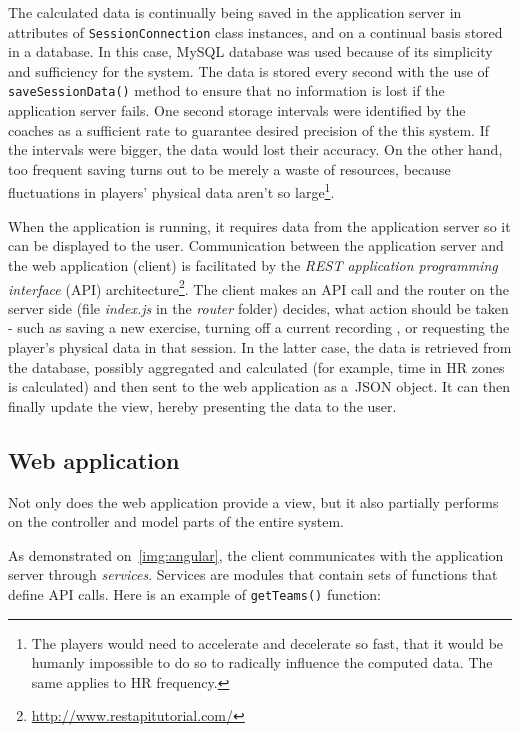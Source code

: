 The calculated data is continually being saved in the application server in attributes of \texttt{SessionConnection} class instances, and on a continual basis stored in a database. In this case, MySQL database was used because of its simplicity and sufficiency for the system. The data is stored every second with the use of \texttt{saveSessionData()} method to ensure that no information is lost if the application server fails. One second storage intervals were identified by the coaches as a sufficient rate to guarantee desired precision of the this system. If the intervals were bigger, the data would lost their accuracy. On the other hand, too frequent saving turns out to be merely a waste of resources, because fluctuations in players’ physical data aren’t so large\footnote{The players would need to accelerate and decelerate so fast, that it would be humanly impossible to do so to radically influence the computed data. The same applies to HR frequency.}.

When the application is running, it requires data from the application server so it can be displayed to the user. Communication between the application server and the web application (client) is facilitated by the \textit{REST application programming interface} (API) architecture\footnote{\url{http://www.restapitutorial.com/}}. The client makes an API call and the router on the server side (file \textit{index.js} in the \textit{router} folder) decides, what action should be taken - such as saving a new exercise, turning off a current recording , or requesting the player’s physical data in that session. In the latter case, the data is retrieved from the database, possibly aggregated and calculated (for example, time in HR zones is calculated) and then sent to the web application as a~JSON object. It can then finally update the view, hereby presenting the data to the user.

\subsection{Web application}\label{web_application}
Not only does the web application provide a view, but it also partially performs on the controller and model parts of the entire system.

As demonstrated on~\ref{img:angular}, the client communicates with the application server through \textit{services}. Services are modules that contain sets of functions that define API calls. Here is an example of \texttt{getTeams()} function:

